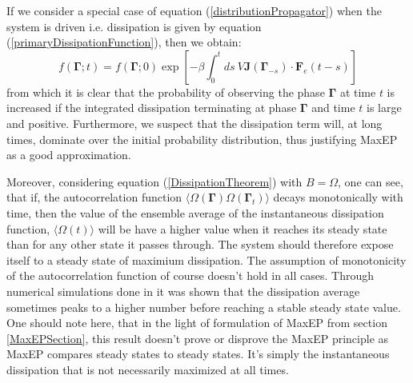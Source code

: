 \documentclass[a4paper,12pt]{article}
\begin{document}
If we consider a special case of equation (\ref{distributionPropagator}) when the system is driven i.e. dissipation is given by equation (\ref{primaryDissipationFunction}), then we obtain:
\begin{equation}
  f(\bm{\Gamma};t)=f(\bm{\Gamma};0)\exp[-\beta \int_0^t ds\ V\bm{J}(\bm{\Gamma}_{-s})\cdot \bm{F}_e(t-s)]
\end{equation}
from which it is clear that the probability of observing the phase $\bm{\Gamma}$ at time $t$ is increased if the integrated dissipation terminating at phase $\bm{\Gamma}$ and time $t$ is large and positive. Furthermore, we suspect that the dissipation term will, at long times, dominate over the initial probability distribution, thus justifying MaxEP as a good approximation.

Moreover, considering equation (\ref{DissipationTheorem}) with $B=\Omega$, one can see, that if, the autocorrelation function $\langle \Omega(\bm{\Gamma})\Omega(\bm{\Gamma}_t)\rangle$ decays monotonically with time, then the value of the ensemble average of the instantaneous dissipation function, $\langle \Omega(t) \rangle$ will be have a higher value when it reaches its steady state than for any other state it passes through. The system should therefore expose itself to a steady state of maximium dissipation.
The assumption of monotonicity of the autocorrelation function of course doesn't hold in all cases. Through numerical simulations done in \cite{Brookes:2011hu} it was shown that the dissipation average sometimes peaks to a higher number before reaching a stable steady state value. 
One should note here, that in the light of formulation of MaxEP from section \ref{MaxEPSection}, this result doesn't prove or disprove the MaxEP principle as MaxEP compares steady states to steady states.
It's simply the instantaneous dissipation that is not necessarily maximized at all times.

\end{document}
